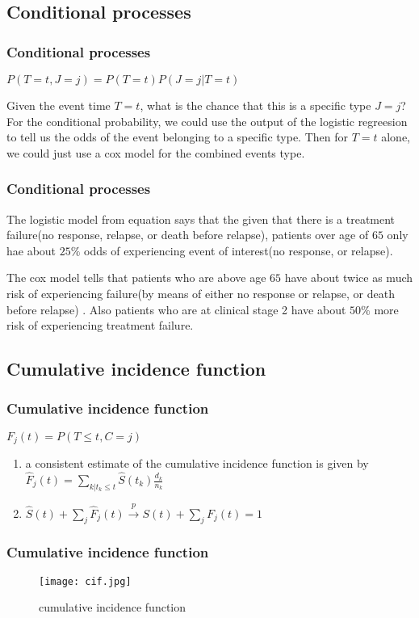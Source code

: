 \documentclass{beamer}[10]
\begin{document}
\subsection{Conditional processes}
\begin{frame}
	\frametitle{Conditional processes}
	$P(T = t, J = j) = P(T =t )P(J = j|T = t)$
	\begin{block}{ }
		Given the event time $T =t$, what is the chance that this is a specific type $J = j$? For the conditional probability, we could use the output of the logistic regreesion to tell us the odds of the event belonging to a specific type. Then for $T = t$ alone, we could just use a cox model for the combined events type.
	\end{block}
\end{frame}
\begin{frame}
	\frametitle{Conditional processes}
	\begin{block}{ }
		The logistic model from equation says that the given that there is a treatment failure(no response, relapse, or death before relapse), patients over age of $65$ only hae about $25\%$ odds of experiencing event of interest(no response, or relapse). 
	\end{block}
	\begin{block}{ }
		The cox model tells that patients who are above age $65$ have about twice as much risk of experiencing failure(by means of either no response or relapse, or death before relapse) . Also  patients who are at clinical stage 2 have about $50\%$ more risk of experiencing treatment failure.
	\end{block}
\end{frame}

\subsection{Cumulative incidence function}
\begin{frame}
	\frametitle{Cumulative incidence function}
	$F_j(t) = P(T \leq t, C = j)$
	\begin{block}{ }
		\begin{enumerate}
			\item  a consistent estimate of the cumulative incidence function is given by $\hat{F}_j(t) = \sum_{k|t_k \leq t} \hat{S}(t_k)\frac{d_k}{n_k}$
			\item $\hat{S}(t) + \sum_j \hat{F}_j(t)\stackrel{p}{\to }S(t) + \sum_j F_j(t) = 1$
		\end{enumerate}
	\end{block}
\end{frame}
\begin{frame}
	\frametitle{Cumulative incidence function}
	\begin{figure}[!htb]
\begin{center}
\caption{cumulative incidence function}
\texttt{[image: cif.jpg]}\label{cif}
\end{center}
\end{figure}
\end{frame}
\end{document}
